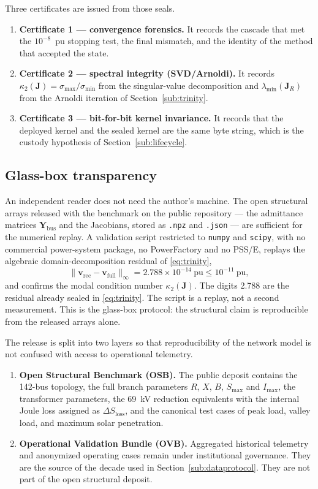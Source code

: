 Three certificates are issued from those seals.
\begin{enumerate}
\item \textbf{Certificate 1 --- convergence forensics.} It records the cascade that met the $10^{-8}$~pu stopping test, the final mismatch, and the identity of the method that accepted the state.
\item \textbf{Certificate 2 --- spectral integrity (SVD/Arnoldi).} It records $\kappa_2(\mathbf{J})=\sigma_{\max}/\sigma_{\min}$ from the singular-value decomposition and $\lambda_{\min}(\mathbf{J}_R)$ from the Arnoldi iteration of Section~\ref{sub:trinity}.
\item \textbf{Certificate 3 --- bit-for-bit kernel invariance.} It records that the deployed kernel and the sealed kernel are the same byte string, which is the custody hypothesis of Section~\ref{sub:lifecycle}.
\end{enumerate}

\subsection{Glass-box transparency}
\label{sub:glassbox}

An independent reader does not need the author's machine. The open structural arrays released with the benchmark on the public repository --- the admittance matrices $\mathbf{Y}_{\mathrm{bus}}$ and the Jacobians, stored as \texttt{.npz} and \texttt{.json} --- are sufficient for the numerical replay. A validation script restricted to \texttt{numpy} and \texttt{scipy}, with no commercial power-system package, no PowerFactory and no PSS/E, replays the algebraic domain-decomposition residual of \eqref{eq:trinity},
\begin{equation*}
\|\mathbf{v}_{\mathrm{rec}}-\mathbf{v}_{\mathrm{full}}\|_\infty = 2.788 \times 10^{-14}\ \mathrm{pu} \le 10^{-11}\ \mathrm{pu},
\end{equation*}
and confirms the modal condition number $\kappa_2(\mathbf{J})$. The digits 2.788 are the residual already sealed in \eqref{eq:trinity}. The script is a replay, not a second measurement. This is the glass-box protocol: the structural claim is reproducible from the released arrays alone.

The release is split into two layers so that reproducibility of the network model is not confused with access to operational telemetry.
\begin{enumerate}
\item \textbf{Open Structural Benchmark (OSB).} The public deposit contains the 142-bus topology, the full branch parameters $R$, $X$, $B$, $S_{\max}$ and $I_{\max}$, the transformer parameters, the 69~kV reduction equivalents with the internal Joule loss assigned as $\Delta S_{\mathrm{loss}}$, and the canonical test cases of peak load, valley load, and maximum solar penetration.
\item \textbf{Operational Validation Bundle (OVB).} Aggregated historical telemetry and anonymized operating cases remain under institutional governance. They are the source of the decade used in Section~\ref{sub:dataprotocol}. They are not part of the open structural deposit.
\end{enumerate}

